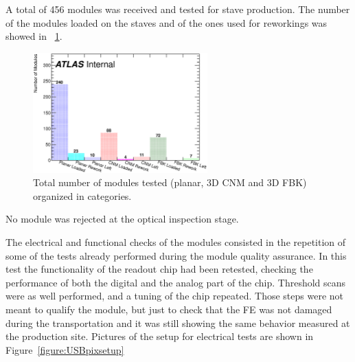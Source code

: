 A total of 456 modules was received and tested for stave production. The number of the modules loaded on the staves and of the ones used for reworkings was showed in ~\ref{figure:numodules}.

\begin{figure}
	\centering
	\includegraphics[width=0.6\textwidth]{Images/ibl_stave_loading/ModuleReceptionTest/modules.eps}
	\caption{Total number of modules tested (planar, 3D CNM and 3D FBK) organized in categories.}
	\label{figure:numodules}
\end{figure}


No module was rejected at the optical inspection stage.

The electrical and functional checks of the modules consisted in the repetition of some of the tests already performed during the module quality assurance. In this test the functionality of the readout chip had been retested, checking the performance of both the digital and the analog part of the chip. Threshold scans were as well performed, and a tuning of the chip repeated. Those steps were not meant to qualify the module, but just to check that the FE was not damaged during the transportation and it was still showing the same behavior measured at the production site. Pictures of the setup for electrical tests are shown in Figure~\ref{figure:USBpixsetup}

